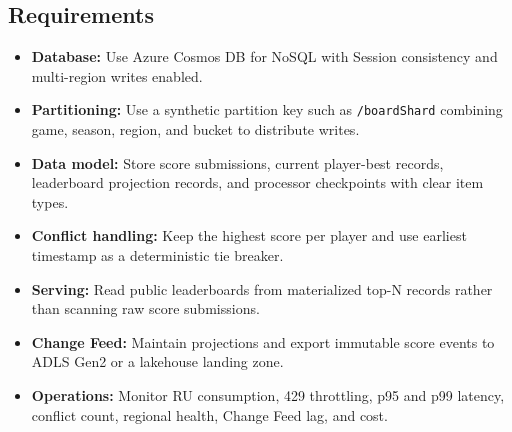 \subsection*{Requirements}
\begin{itemize}
    \item \textbf{Database:} Use Azure Cosmos DB for NoSQL with Session consistency and multi-region writes enabled.
    \item \textbf{Partitioning:} Use a synthetic partition key such as \texttt{/boardShard} combining game, season, region, and bucket to distribute writes.
    \item \textbf{Data model:} Store score submissions, current player-best records, leaderboard projection records, and processor checkpoints with clear item types.
    \item \textbf{Conflict handling:} Keep the highest score per player and use earliest timestamp as a deterministic tie breaker.
    \item \textbf{Serving:} Read public leaderboards from materialized top-N records rather than scanning raw score submissions.
    \item \textbf{Change Feed:} Maintain projections and export immutable score events to ADLS Gen2 or a lakehouse landing zone.
    \item \textbf{Operations:} Monitor RU consumption, 429 throttling, p95 and p99 latency, conflict count, regional health, Change Feed lag, and cost.
\end{itemize}

